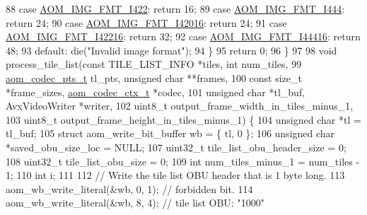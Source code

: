 \begin{DoxyCodeInclude}
{88     \textcolor{keywordflow}{case} \hyperlink{aom__image_8h_a930317c04b4bd0a660bb5e744055523cab2f75281e94ebc0f0bc728ef287cd3e8}{AOM\_IMG\_FMT\_I422}: \textcolor{keywordflow}{return} 16;
89     \textcolor{keywordflow}{case} \hyperlink{aom__image_8h_a930317c04b4bd0a660bb5e744055523ca89d423506e948ab7d3b98b5750b92655}{AOM\_IMG\_FMT\_I444}: \textcolor{keywordflow}{return} 24;
90     \textcolor{keywordflow}{case} \hyperlink{aom__image_8h_a930317c04b4bd0a660bb5e744055523ca20a9cf30277260685642b4cfb4e9273b}{AOM\_IMG\_FMT\_I42016}: \textcolor{keywordflow}{return} 24;
91     \textcolor{keywordflow}{case} \hyperlink{aom__image_8h_a930317c04b4bd0a660bb5e744055523ca064683ed4260fc6244af6cfc9d261c22}{AOM\_IMG\_FMT\_I42216}: \textcolor{keywordflow}{return} 32;
92     \textcolor{keywordflow}{case} \hyperlink{aom__image_8h_a930317c04b4bd0a660bb5e744055523cab9b93d397dedbdd6bfafec84d1f8f0f5}{AOM\_IMG\_FMT\_I44416}: \textcolor{keywordflow}{return} 48;
93     \textcolor{keywordflow}{default}: die(\textcolor{stringliteral}{"Invalid image format"});
94   \}
95   \textcolor{keywordflow}{return} 0;
96 \}
97 
98 \textcolor{keywordtype}{void} process\_tile\_list(\textcolor{keyword}{const} TILE\_LIST\_INFO *tiles, \textcolor{keywordtype}{int} num\_tiles,
99                        \hyperlink{group__encoder_ga958524226c9a65251c9e4f7bb78fc606}{aom\_codec\_pts\_t} tl\_pts, \textcolor{keywordtype}{unsigned} \textcolor{keywordtype}{char} **frames,
100                        \textcolor{keyword}{const} \textcolor{keywordtype}{size\_t} *frame\_sizes, \hyperlink{structaom__codec__ctx}{aom\_codec\_ctx\_t} *codec,
101                        \textcolor{keywordtype}{unsigned} \textcolor{keywordtype}{char} *tl\_buf, AvxVideoWriter *writer,
102                        uint8\_t output\_frame\_width\_in\_tiles\_minus\_1,
103                        uint8\_t output\_frame\_height\_in\_tiles\_minus\_1) \{
104   \textcolor{keywordtype}{unsigned} \textcolor{keywordtype}{char} *tl = tl\_buf;
105   \textcolor{keyword}{struct }aom\_write\_bit\_buffer wb = \{ tl, 0 \};
106   \textcolor{keywordtype}{unsigned} \textcolor{keywordtype}{char} *saved\_obu\_size\_loc = NULL;
107   uint32\_t tile\_list\_obu\_header\_size = 0;
108   uint32\_t tile\_list\_obu\_size = 0;
109   \textcolor{keywordtype}{int} num\_tiles\_minus\_1 = num\_tiles - 1;
110   \textcolor{keywordtype}{int} i;
111 
112   \textcolor{comment}{// Write the tile list OBU header that is 1 byte long.}
113   aom\_wb\_write\_literal(&wb, 0, 1);  \textcolor{comment}{// forbidden bit.}
114   aom\_wb\_write\_literal(&wb, 8, 4);  \textcolor{comment}{// tile list OBU: "1000"}
}
\end{DoxyCodeInclude}
